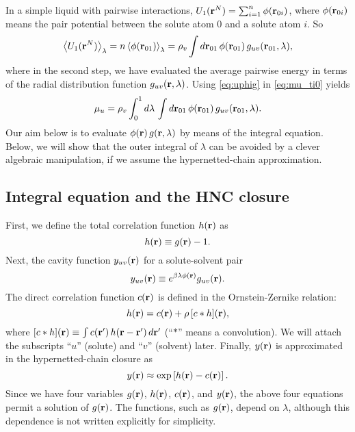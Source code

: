 \documentclass[12pt]{article}
\begin{document}
In a simple liquid with pairwise interactions,
  $U_1(\mathbf{r}^N) = \sum_{i = 1}^{n} \phi(\mathbf{r}_{0i})$,
  where $\phi(\mathbf{r}_{0i})$ means the pair potential
  between the solute atom $0$ and a solute atom $i$.
So
\begin{equation}
    \left\langle
      U_1(\mathbf{r}^N)
    \right\rangle_\lambda
    =
    n
    \left\langle
      \phi(\mathbf{r}_{01})
    \right\rangle_\lambda
    =
    \rho_v \int d\mathbf{r}_{01} \,
      \phi(\mathbf{r}_{01}) \, g_{uv}(\mathbf{r}_{01}, \lambda),
  \label{eq:uphig}
\end{equation}
%
where in the second step, we have evaluated the average
pairwise energy in terms of the radial distribution function
$g_{uv}(\mathbf{r}, \lambda)$.
Using \eqref{eq:uphig} in \eqref{eq:mu_ti0} yields
\begin{equation}
    \mu_u
    =
    \rho_v
    \int_0^1 d\lambda \,
      \int d\mathbf{r}_{01} \,
        \phi(\mathbf{r}_{01}) \, g_{uv}(\mathbf{r}_{01}, \lambda).
  \label{eq:mu_ti}
\end{equation}
Our aim below is to evaluate
$\phi(\mathbf{r}) \, g(\mathbf{r}, \lambda)$
by means of the integral equation.
%
Below, we will show that the outer integral of $\lambda$
  can be avoided by a clever algebraic manipulation,
  if we assume the hypernetted-chain approximation.



\subsection{\label{sec:funcs}Integral equation and the HNC closure}

First, we define the total correlation function $h(\mathbf{r})$ as
\begin{equation}
  h(\mathbf{r}) \equiv g(\mathbf{r}) - 1.
  \label{eq:hr}
\end{equation}
%
%
%
Next, the cavity function $y_{uv}(\mathbf{r})$ for a solute-solvent pair
\begin{equation}
  y_{uv}(\mathbf{r}) \equiv e^{ \beta \lambda \phi(\mathbf{r}) } g_{uv}(\mathbf{r}).
  \label{eq:yr}
\end{equation}
%
%
%
The direct correlation function $c(\mathbf{r})$
is defined in the Ornstein-Zernike relation:
\begin{equation}
  h(\mathbf{r}) = c(\mathbf{r}) + \rho \, [c * h](\mathbf{r}),
  \label{eq:oz}
\end{equation}
where $[c*h](\mathbf{r}) \equiv \int c(\mathbf{r}') \, h(\mathbf{r} - \mathbf{r}') \, d\mathbf{r}'$
  (``$*$'' means a convolution).
We will attach the subscripts ``$u$'' (solute) and ``$v$'' (solvent) later.
%
%
%
%
%
%
Finally, $y(\mathbf{r})$ is approximated in the hypernetted-chain closure as
\begin{equation}
  y(\mathbf{r}) \approx \exp\left[ h(\mathbf{r}) - c(\mathbf{r}) \right].
  \label{eq:hnc}
\end{equation}
Since we have four variables
  $g(\mathbf{r})$, $h(\mathbf{r})$, $c(\mathbf{r})$, and $y(\mathbf{r})$,
the above four equations permit a solution of $g(\mathbf{r})$.
%
%
%
The functions, such as $g(\mathbf{r})$, depend on $\lambda$,
although this dependence is not written explicitly for simplicity.
\end{document}
